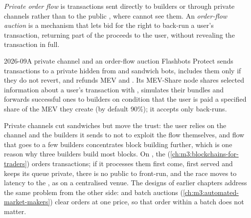 \begin{definition}\label{def:m3:maximal-extractable-value:private}
\emph{Private order flow} is transactions sent directly to builders or through private channels rather than to the public
, where  cannot see them. An \emph{order-flow auction} is a mechanism that lets  bid for the right to
back-run a user's transaction, returning part of the proceeds to the user, without revealing the transaction in full.
\end{definition}

\begin{dated}{2026-09}{A private channel and an order-flow auction}\label{dat:m3:maximal-extractable-value:protect}
Flashbots Protect sends transactions to a private  hidden from  and sandwich bots, includes them only if they do not revert, and
refunds MEV and . Its MEV-Share node shares selected information about a user's transaction with , simulates their bundles and
forwards successful ones to builders on condition that the user is paid a specified share of the MEV they create (by default 90\%); it accepts only
back-runs.
\end{dated}

Private channels cut sandwiches but move the trust: the user relies on the channel and the builders it sends to not to exploit the flow themselves,
and flow that goes to a few builders concentrates block building further, which is one reason why three builders build most blocks. On , the
 (\cref{ch:m3:blockchains-for-traders}) orders transactions; if it processes them first come, first served and keeps its queue private, there is
no public  to front-run, and the race moves to latency to the , as on a centralised venue. The designs of earlier chapters address the
same problem from the other side:  and batch auctions (\cref{ch:m3:automated-market-makers}) clear orders at one price, so that order
within a batch does not matter.

